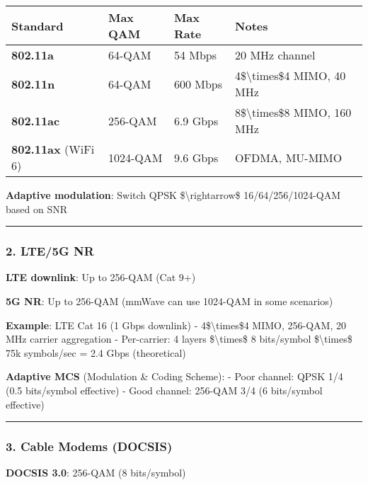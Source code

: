 {\def\LTcaptype{} %
\begin{longtable}[]{@{}llll@{}}
\toprule\noalign{}
Standard & Max QAM & Max Rate & Notes \\
\midrule\noalign{}
\endhead
\bottomrule\noalign{}
\endlastfoot
\textbf{802.11a} & 64-QAM & 54 Mbps & 20 MHz channel \\
\textbf{802.11n} & 64-QAM & 600 Mbps & 4\$\textbackslash times\$4 MIMO,
40 MHz \\
\textbf{802.11ac} & 256-QAM & 6.9 Gbps & 8\$\textbackslash times\$8
MIMO, 160 MHz \\
\textbf{802.11ax} (WiFi 6) & 1024-QAM & 9.6 Gbps & OFDMA, MU-MIMO \\
\end{longtable}
}

\textbf{Adaptive modulation}: Switch QPSK \$\textbackslash rightarrow\$
16/64/256/1024-QAM based on SNR

\begin{center}\rule{0.5\linewidth}{0.5pt}\end{center}

\subsubsection{2. LTE/5G NR}\label{lte5g-nr}

\textbf{LTE downlink}: Up to 256-QAM (Cat 9+)

\textbf{5G NR}: Up to 256-QAM (mmWave can use 1024-QAM in some
scenarios)

\textbf{Example}: LTE Cat 16 (1 Gbps downlink) -
4\$\textbackslash times\$4 MIMO, 256-QAM, 20 MHz carrier aggregation -
Per-carrier: 4 layers \$\textbackslash times\$ 8 bits/symbol
\$\textbackslash times\$ 75k symbols/sec = 2.4 Gbps (theoretical)

\textbf{Adaptive MCS} (Modulation \& Coding Scheme): - Poor channel:
QPSK 1/4 (0.5 bits/symbol effective) - Good channel: 256-QAM 3/4 (6
bits/symbol effective)

\begin{center}\rule{0.5\linewidth}{0.5pt}\end{center}

\subsubsection{3. Cable Modems (DOCSIS)}\label{cable-modems-docsis}

\textbf{DOCSIS 3.0}: 256-QAM (8 bits/symbol)

